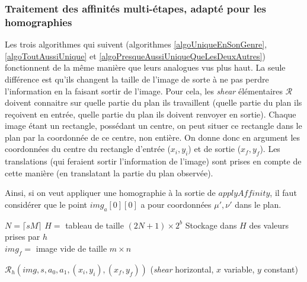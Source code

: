   \subsubsection{Traitement des affinités multi-étapes, adapté pour les homographies}
  Les trois algorithmes qui suivent (algorithmes \ref{algoUniqueEnSonGenre}, \ref{algoToutAussiUnique} et \ref{algoPresqueAussiUniqueQueLesDeuxAutres}) fonctionnent de la même manière que leurs analogues vus plus haut. La seule différence est qu'ils changent la taille de l'image de sorte à ne pas perdre l'information en la faisant sortir de l'image. Pour cela, les \emph{shear} élémentaires $\mathcal R$ doivent connaitre sur quelle partie du plan ils travaillent (quelle partie du plan ils reçoivent en entrée, quelle partie du plan ils doivent renvoyer en sortie). Chaque image étant un rectangle, possédant un centre, on peut situer ce rectangle dans le plan par la coordonnée de ce centre, non entière. On donne donc en argument les coordonnées du centre du rectangle d'entrée ($x_i,y_i$) et de sortie ($x_f,y_f$). Les translations (qui feraient sortir l'information de l'image) sont prises en compte de cette manière (en translatant la partie du plan observée).
  
  Ainsi, si on veut appliquer une homographie à la sortie de $applyAffinity$, il faut considérer que le point $img_a[0][0]$ a pour coordonnées $\mu',\nu'$ dans le plan.
  
   \begin{algorithme}
    $N = \lceil sM \rceil$\;
    $H = $ tableau de taille $(2N+1) \times 2^b$\;
    Stockage dans $H$ des valeurs prises par $h$\;\ \\
    $img_f = $ image vide de taille $m \times n$\;
    \caption{$\mathcal{R}_h(img,s,a_0,a_1,(x_i,y_i),(x_f,y_f))$ (\textit{shear} horizontal, $x$ variable, $y$ constant)}
    \label{algoUniqueEnSonGenre}
   \end{algorithme}










